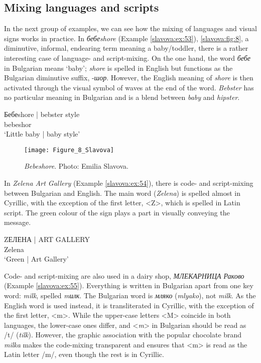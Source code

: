 \documentclass[output=paper]{langscibook}
\begin{document}
\subsection{Mixing languages and scripts}
In the next group of examples, we can see how the mixing of languages and visual signs works in practice. In \textit{бебеshore} (Example \ref{slavova:ex:53}), \autoref{slavova:fig:8}, a diminutive, informal, endearing term meaning a baby/toddler, there is a rather interesting case of language- and script-mixing. On the one hand, the word \textit{бебе} in Bulgarian means ‘baby’; \textit{shore} is spelled in English but functions as the Bulgarian diminutive suffix, -\textit{шор}. However, the English meaning of \textit{shore} is then activated through the visual symbol of waves at the end of the word. \textit{Bebster} has no particular meaning in Bulgarian and is a blend between \textit{baby} and \textit{hipster}.

\begin{exe}
  \ex\label{slavova:ex:53}
  \gll Бебеshore {| bebster style} \\
  bebeshor { } \\
  \glt ‘Little baby | baby style’
\end{exe}

\begin{figure}
  \texttt{[image: Figure\_8\_Slavova]}
  \caption{\textit{Bebeshore}. Photo: Emilia Slavova.}
  \label{slavova:fig:8}
\end{figure}


In \textit{Zelena Art Gallery} (Example \ref{slavova:ex:54}), there is code- and script-mixing between Bulgarian and English. The main word (\textit{Zelena}) is spelled almost in Cyrillic, with the exception of the first letter, <Z>, which is spelled in Latin script. The green colour of the sign plays a part in visually conveying the message.

\begin{exe}
  \ex\label{slavova:ex:54}
  \gll ZЕЛЕНА {| ART GALLERY} \\
  Zelena { } \\
  \glt ‘Green | Art Gallery’
\end{exe}


Code- and script-mixing are also used in a dairy shop, \textit{МЛЕКАРНИЦА Раково} (Example \ref{slavova:ex:55}). Everything is written in Bulgarian apart from one key word: \textit{milk}, spelled \textit{mилк}. The Bulgarian word is \textit{мляко} (\textit{mlyako}), not \textit{milk}. As the English word is used instead, it is transliterated in Cyrillic, with the exception of the first letter, <m>. While the upper-case letters <M> coincide in both languages, the lower-case ones differ, and <\textit{m}> in Bulgarian should be read as /t/ (\textit{tilk}). However, the graphic association with the popular chocolate brand \textit{milka} makes the code-mixing transparent and ensures that <m> is read as the Latin letter /m/, even though the rest is in Cyrillic.
\end{document}
